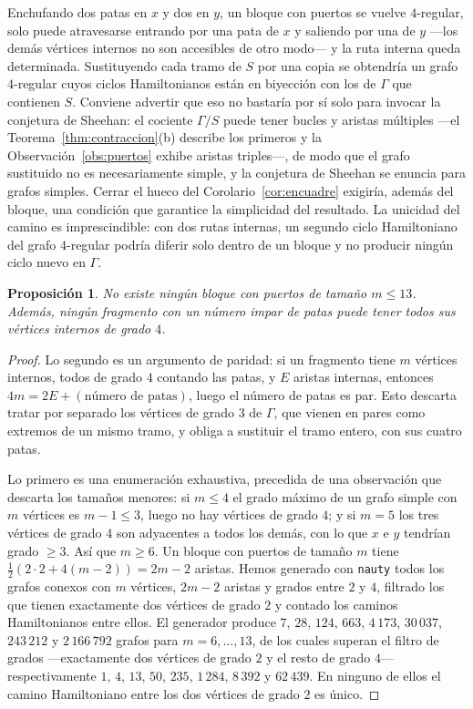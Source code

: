 \documentclass[11pt,a4paper]{article}
\newtheorem{proposicion}[teorema]{Proposición}
\theoremstyle{definition}
\theoremstyle{remark}
\begin{document}
Enchufando dos patas en $x$ y dos en $y$, un bloque con puertos se vuelve $4$-regular, solo puede atravesarse entrando por una pata de $x$ y saliendo por una de $y$ —los demás vértices internos no son accesibles de otro modo— y la ruta interna queda determinada. Sustituyendo cada tramo de $S$ por una copia se obtendría un grafo $4$-regular cuyos ciclos Hamiltonianos están en biyección con los de $\Gamma$ que contienen $S$. Conviene advertir que eso no bastaría por sí solo para invocar la conjetura de Sheehan: el cociente $\Gamma/S$ puede tener bucles y aristas múltiples —el Teorema~\ref{thm:contraccion}(b) describe los primeros y la Observación~\ref{obs:puertos} exhibe aristas triples—, de modo que el grafo sustituido no es necesariamente simple, y la conjetura de Sheehan se enuncia para grafos simples. Cerrar el hueco del Corolario~\ref{cor:encuadre} exigiría, además del bloque, una condición que garantice la simplicidad del resultado. La unicidad del camino es imprescindible: con dos rutas internas, un segundo ciclo Hamiltoniano del grafo $4$-regular podría diferir solo dentro de un bloque y no producir ningún ciclo nuevo en $\Gamma$.

\begin{proposicion}\label{prop:nogadget}
No existe ningún bloque con puertos de tamaño $m\le13$. Además, ningún fragmento con un número impar de patas puede tener todos sus vértices internos de grado $4$.
\end{proposicion}

\begin{proof}
Lo segundo es un argumento de paridad: si un fragmento tiene $m$ vértices internos, todos de grado $4$ contando las patas, y $E$ aristas internas, entonces $4m=2E+(\text{número de patas})$, luego el número de patas es par. Esto descarta tratar por separado los vértices de grado $3$ de $\Gamma$, que vienen en pares como extremos de un mismo tramo, y obliga a sustituir el tramo entero, con sus cuatro patas.

Lo primero es una enumeración exhaustiva, precedida de una observación que descarta los tamaños menores: si $m\le4$ el grado máximo de un grafo simple con $m$ vértices es $m-1\le3$, luego no hay vértices de grado $4$; y si $m=5$ los tres vértices de grado $4$ son adyacentes a todos los demás, con lo que $x$ e $y$ tendrían grado $\ge3$. Así que $m\ge6$. Un bloque con puertos de tamaño $m$ tiene $\tfrac12(2\cdot2+4(m-2))=2m-2$ aristas. Hemos generado con \texttt{nauty} todos los grafos conexos con $m$ vértices, $2m-2$ aristas y grados entre $2$ y $4$, filtrado los que tienen exactamente dos vértices de grado $2$ y contado los caminos Hamiltonianos entre ellos. El generador produce $7$, $28$, $124$, $663$, $4\,173$, $30\,037$, $243\,212$ y $2\,166\,792$ grafos para $m=6,\dots,13$, de los cuales superan el filtro de grados —exactamente dos vértices de grado $2$ y el resto de grado $4$— respectivamente $1$, $4$, $13$, $50$, $235$, $1\,284$, $8\,392$ y $62\,439$. En ninguno de ellos el camino Hamiltoniano entre los dos vértices de grado $2$ es único.
\end{proof}
\end{document}
